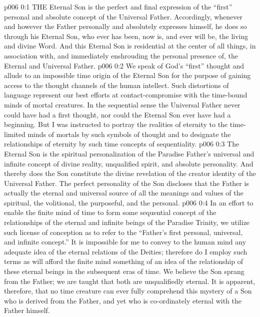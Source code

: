 \vs p006 0:1 THE Eternal Son is the perfect and final expression of the “first” personal and absolute concept of the Universal Father. Accordingly, whenever and however the Father personally and absolutely expresses himself, he does so through his Eternal Son, who ever has been, now is, and ever will be, the living and divine Word. And this Eternal Son is residential at the center of all things, in association with, and immediately enshrouding the personal presence of, the Eternal and Universal Father.
\vs p006 0:2 We speak of God’s “first” thought and allude to an impossible time origin of the Eternal Son for the purpose of gaining access to the thought channels of the human intellect. Such distortions of language represent our best efforts at contact\hyp{}compromise with the time\hyp{}bound minds of mortal creatures. In the sequential sense the Universal Father never could have had a first thought, nor could the Eternal Son ever have had a beginning. But I was instructed to portray the realities of eternity to the time\hyp{}limited minds of mortals by such symbols of thought and to designate the relationships of eternity by such time concepts of sequentiality.
\vs p006 0:3 The Eternal Son is the spiritual personalization of the Paradise Father’s universal and infinite concept of divine reality, unqualified spirit, and absolute personality. And thereby does the Son constitute the divine revelation of the creator identity of the Universal Father. The perfect personality of the Son discloses that the Father is actually the eternal and universal source of all the meanings and values of the spiritual, the volitional, the purposeful, and the personal.
\vs p006 0:4 In an effort to enable the finite mind of time to form some sequential concept of the relationships of the eternal and infinite beings of the Paradise Trinity, we utilize such license of conception as to refer to the “Father’s first personal, universal, and infinite concept.” It is impossible for me to convey to the human mind any adequate idea of the eternal relations of the Deities; therefore do I employ such terms as will afford the finite mind something of an idea of the relationship of these eternal beings in the subsequent eras of time. We believe the Son sprang from the Father; we are taught that both are unqualifiedly eternal. It is apparent, therefore, that no time creature can ever fully comprehend this mystery of a Son who is derived from the Father, and yet who is co\hyp{}ordinately eternal with the Father himself.
